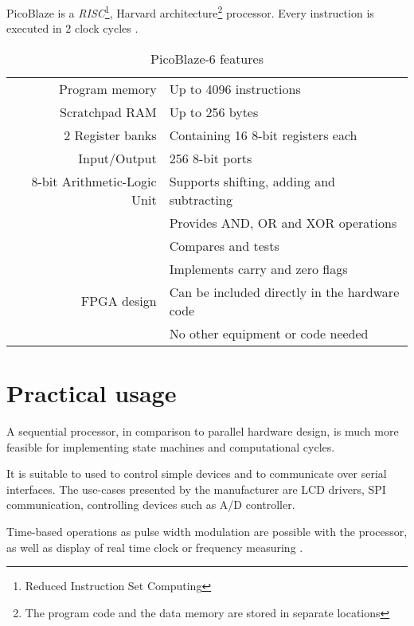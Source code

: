     PicoBlaze is a \emph{RISC}\footnote{Reduced Instruction Set Computing}, Harvard architecture\footnote{The program code and the data memory are stored in separate locations} processor. Every instruction is executed in 2 clock cycles \cite{PicoBlaze6}.

    \begin{table}[H]
    \centering
    \begin{tabular}{ @{\extracolsep{\fill} } r | l }
        Program memory & Up to 4096 instructions \\

        Scratchpad RAM & Up to 256 bytes \\

        2 Register banks & Containing 16 8-bit registers each\\

        Input/Output & 256 8-bit ports \\

        8-bit Arithmetic-Logic Unit & Supports shifting, adding and subtracting \\
                                    & Provides AND, OR and XOR operations \\
                                    & Compares and tests \\
                                    & Implements carry and zero flags \\

        FPGA design & Can be included directly in the hardware code \\
                    & No other equipment or code needed \\
    \end{tabular}
    \caption{PicoBlaze-6 features \cite{PicoBlazeWeb}}
    \end{table}

    \section{Practical usage}

    A sequential processor, in comparison to parallel hardware design, is much more feasible for implementing state machines and computational cycles.

    It is suitable to used to control simple devices and to communicate over serial interfaces. The use-cases presented by the manufacturer are LCD drivers, SPI communication, controlling devices such as A/D controller.

    Time-based operations as pulse width modulation are possible with the processor, as well as display of real time clock or frequency measuring \cite{PicoBlazeExamples}.

